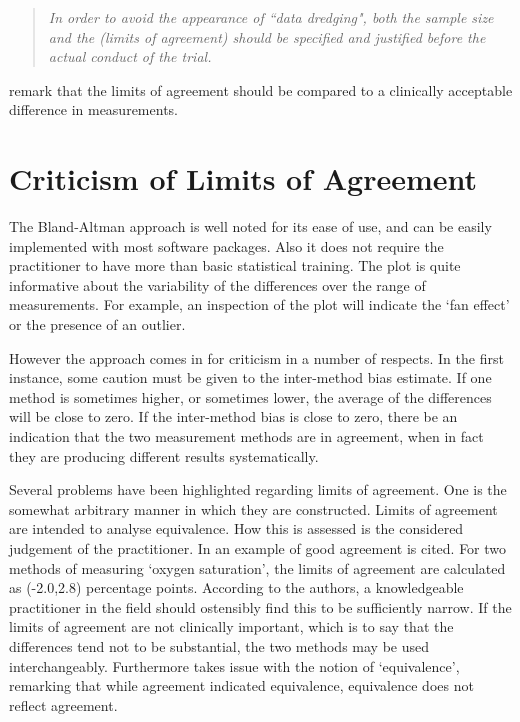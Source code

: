 \documentclass[12pt, a4paper]{report}
\theoremstyle{plain}
\theoremstyle{definition}
\theoremstyle{remark}
\begin{document}
\begin{quote}
	\textit{In order to avoid the appearance of ``data dredging", both the
		sample size and the (limits of agreement) should be specified and
		justified before the actual conduct of the trial.} \citep{lin}
\end{quote}

\citet{Dewitte} remark that the limits of agreement should be
compared to a clinically acceptable difference in measurements.

\section{Criticism of Limits of Agreement}
The Bland-Altman approach is well noted for its ease of use, and can be easily implemented with most software packages. Also it does not require the practitioner to have more than basic statistical training. The plot is quite informative about the variability of the differences over the range of measurements. For
example, an inspection of the plot will indicate the `fan effect' or the presence of an outlier.





%
%

However the approach comes in for criticism in a number of respects. In the first instance, some caution must be given to the inter-method bias estimate.
If one method is sometimes higher, or sometimes lower, the average of the differences will be close to zero. If the inter-method bias is close to zero, there be an indication that the two measurement methods are in agreement, when in fact they are producing different results systematically.

Several problems have been highlighted regarding limits of agreement. One is the somewhat arbitrary manner in which they are constructed. Limits of agreement are intended to analyse equivalence. How this is assessed is the considered judgement of the practitioner. In \citet{BA86} an example of good agreement is cited. For two methods of measuring `oxygen saturation', the limits of agreement are calculated as (-2.0,2.8) percentage points. According to the authors, a knowledgeable practitioner in the field should ostensibly find this to be sufficiently narrow. If the limits of agreement are not clinically important, which is to say that the differences tend not to be substantial, the two methods may be used interchangeably. Furthermore \citet{DunnSEME} takes issue
with the notion of `equivalence', remarking that while agreement
indicated equivalence, equivalence does not reflect agreement.
\end{document}

